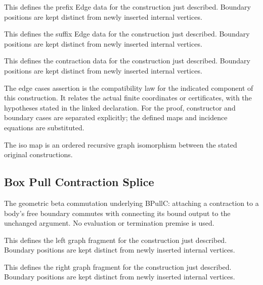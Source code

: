 This defines the prefix Edge data for the construction just described. Boundary positions are kept distinct from newly inserted internal vertices.
\par{}

This defines the suffix Edge data for the construction just described. Boundary positions are kept distinct from newly inserted internal vertices.
\par{}

This defines the contraction data for the construction just described. Boundary positions are kept distinct from newly inserted internal vertices.
\par{}

The edge cases assertion is the compatibility law for the indicated component of this construction. It relates the actual finite coordinates or certificates, with the hypotheses stated in the linked declaration.
For the proof, constructor and boundary cases are separated explicitly; the defined maps and incidence equations are substituted.
\par{}

The iso map is an ordered recursive graph isomorphism between the stated original constructions.
\par{}

\subsection{Box Pull Contraction Splice}
The geometric beta commutation underlying BPullC: attaching a contraction to a body's free boundary commutes with connecting its bound output to the unchanged argument. No evaluation or termination premise is used.

This defines the left graph fragment for the construction just described. Boundary positions are kept distinct from newly inserted internal vertices.
\par{}

This defines the right graph fragment for the construction just described. Boundary positions are kept distinct from newly inserted internal vertices.
\par{}

